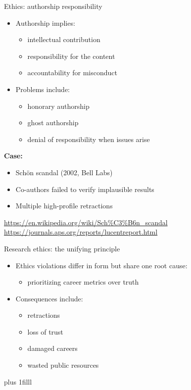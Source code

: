 \documentclass[aspectratio=169]{beamer}
\newcommand{\btVFill}{\vskip0pt plus 1filll}
\begin{document}
\begin{frame}{Ethics: authorship responsibility}
  \begin{itemize}
    \item Authorship implies:
      \begin{itemize}
        \item intellectual contribution
        \item responsibility for the content
        \item accountability for misconduct
      \end{itemize}
    \item Problems include:
      \begin{itemize}
        \item honorary authorship
        \item ghost authorship
        \item denial of responsibility when issues arise
      \end{itemize}
  \end{itemize}

  \vspace{0.5em}
  \textbf{Case:}
  \begin{itemize}
    \item Sch\"on scandal (2002, Bell Labs)
    \item Co-authors failed to verify implausible results
    \item Multiple high-profile retractions
  \end{itemize}

  \vspace{0.3em}
  \tiny
  \url{https://en.wikipedia.org/wiki/Sch\%C3\%B6n_scandal}\\
  \url{https://journals.aps.org/reports/lucentreport.html}
  \vspace{0.5em}
\end{frame}

\begin{frame}{Research ethics: the unifying principle}
  \begin{itemize}
    \item Ethics violations differ in form but share one root cause:
      \begin{itemize}
        \item prioritizing career metrics over truth
      \end{itemize}
    \item Consequences include:
      \begin{itemize}
        \item retractions
        \item loss of trust
        \item damaged careers
        \item wasted public resources
      \end{itemize}
  \end{itemize}
\btVFill
\end{frame}
\end{document}
